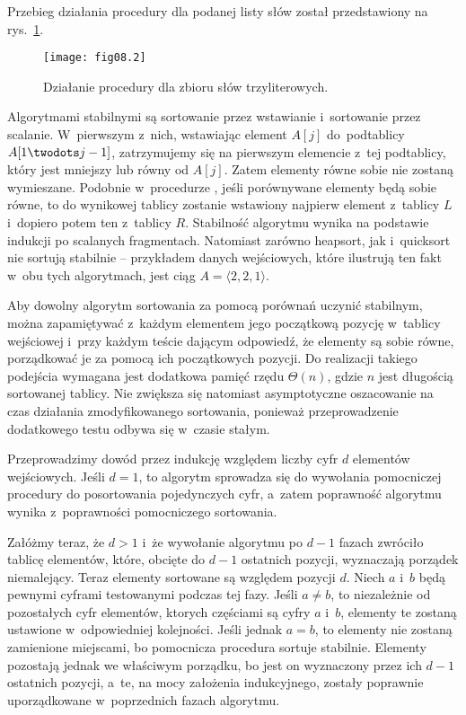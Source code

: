 
\exercise %
Przebieg działania procedury  dla podanej listy słów został przedstawiony na rys.~\ref{fig:8.3-1}.
\begin{figure}[ht]
	\begin{center}
		\texttt{[image: fig08.2]}
	\end{center}
	\caption{Działanie procedury  dla zbioru słów trzyliterowych.} \label{fig:8.3-1}
\end{figure}

\exercise %
Algorytmami stabilnymi są sortowanie przez wstawianie i~sortowanie przez scalanie. W~pierwszym z~nich, wstawiając element $A[j]$ do~podtablicy $A[1\twodots j-1]$, zatrzymujemy się na pierwszym elemencie z~tej podtablicy, który jest mniejszy lub równy od $A[j]$. Zatem elementy równe sobie nie zostaną wymieszane. Podobnie w~procedurze , jeśli porównywane elementy będą sobie równe, to do wynikowej tablicy zostanie wstawiony najpierw element z~tablicy $L$ i~dopiero potem ten z~tablicy $R$. Stabilność algorytmu wynika na podstawie indukcji po scalanych fragmentach. Natomiast zarówno heapsort, jak i~quicksort nie sortują stabilnie -- przykładem danych wejściowych, które ilustrują ten fakt w~obu tych algorytmach, jest ciąg $A=\langle2,2,1\rangle$.

Aby dowolny algorytm sortowania za pomocą porównań uczynić stabilnym, można zapamiętywać z~każdym elementem jego początkową pozycję w~tablicy wejściowej i~przy każdym teście dającym odpowiedź, że elementy są sobie równe, porządkować je za pomocą ich początkowych pozycji. Do realizacji takiego podejścia wymagana jest dodatkowa pamięć rzędu $\Theta(n)$, gdzie $n$ jest długością sortowanej tablicy. Nie zwiększa się natomiast asymptotyczne oszacowanie na czas działania zmodyfikowanego sortowania, ponieważ przeprowadzenie dodatkowego testu odbywa się w~czasie stałym.

\exercise %
Przeprowadzimy dowód przez indukcję względem liczby cyfr $d$ elementów wejściowych. Jeśli $d=1$, to algorytm  sprowadza się do wywołania pomocniczej procedury do posortowania pojedynczych cyfr, a~zatem poprawność algorytmu wynika z~poprawności pomocniczego sortowania.

Załóżmy teraz, że $d>1$ i~że wywołanie algorytmu  po $d-1$ fazach zwróciło tablicę elementów, które, obcięte do $d-1$ ostatnich pozycji, wyznaczają porządek niemalejący. Teraz elementy sortowane są względem pozycji $d$. Niech $a$ i~$b$ będą pewnymi cyframi testowanymi podczas tej fazy. Jeśli $a\ne b$, to niezależnie od pozostałych cyfr elementów, ktorych częściami są cyfry $a$ i~$b$, elementy te zostaną ustawione w~odpowiedniej kolejności. Jeśli jednak $a=b$, to elementy nie zostaną zamienione miejscami, bo pomocnicza procedura sortuje stabilnie. Elementy pozostają jednak we właściwym porządku, bo jest on wyznaczony przez ich $d-1$ ostatnich pozycji, a~te, na mocy założenia indukcyjnego, zostały poprawnie uporządkowane w~poprzednich fazach algorytmu.

